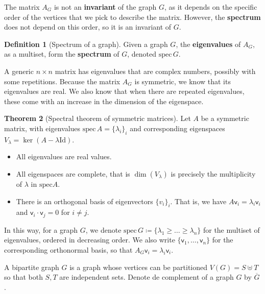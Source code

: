 \documentclass[12pt]{amsart}
\theoremstyle{definition}
\newtheorem{thm}{Theorem}[section]
\newtheorem{defin}[thm]{Definition}
\newcommand{\vv}{\mathsf{v}}
\newcommand{\Id}{\mathrm{Id}}
\newcommand{\spec}{\mathrm{spec} }
\begin{document}
The matrix $A_G$ is not an \textbf{invariant} of the graph $G$, as it depends on the specific order of the vertices that we pick to describe the matrix.
However, the \textbf{spectrum} does not depend on this order, so it is an invariant of $G$.

\begin{defin}[Spectrum of a graph]
Given a graph $G$, the \textbf{eigenvalues} of $A_G$, as a multiset, form the \textbf{spectrum} of $G$, denoted $\spec \, G$.
\end{defin}

A generic $n\times n$ matrix has eigenvalues that are complex numbers, possibly with some repetitions.
Because the matrix $A_G$ is symmetric, we know that its eigenvalues are real.
We also know that when there are repeated eigenvalues, these come with an increase in the dimension of the eigenspace.

\begin{thm}[Spectral theorem of symmetric matrices]\label{thm:spect}
Let $A$ be a symmetric matrix, with eigenvalues $\spec \, A = \{\lambda_i\}_i$ and corresponding eigenspaces $V_{\lambda} = \ker(A - \lambda \Id)$.

\begin{itemize}
\item All eigenvalues are real values.

\item All eigenspaces are complete, that is $\dim (V_{\lambda})$ is precisely the multiplicity of $\lambda $ in $\spec A$.

\item There is an orthogonal basis of eigenvectors $\{v_i\}_i$.
That is, we have $A \vv_i = \lambda_i \vv_i$ and $\vv_i \cdot \vv_j = 0 $ for $i \neq j$.
\end{itemize}
\end{thm}

In this way, for a graph $G$, we denote $\spec \, G \coloneqq \{ \lambda_1 \geq  \dots \geq \lambda_n \}$ for the multiset of eigenvalues, ordered in decreasing order.
We also write $\{ \vv_1, \ldots , \vv_n\}$ for the corresponding orthonormal basis, so that $A_G \vv_i = \lambda_i \vv_i$.

A bipartite graph $G$ is a graph whose vertices can be partitioned $V(G) = S\uplus T$ so that both $S, T$ are independent sets.
Denote de complement of a graph $G$ by $\overline{G}$.
\end{document}
